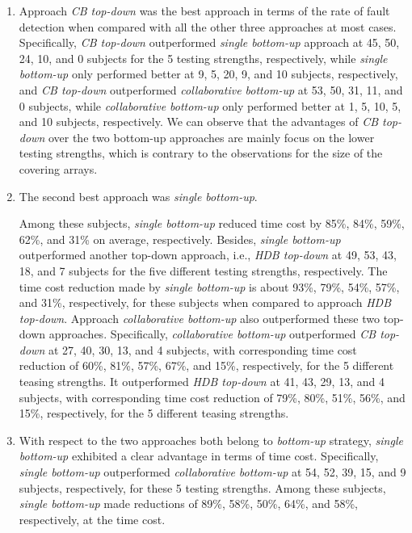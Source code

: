 \documentclass[conference]{IEEEtran}
\theoremstyle{definition}
\begin{document}
 \begin{enumerate}
 \item Approach \emph{CB top-down} was the best approach in terms of the rate of fault detection when compared with all the other three approaches at most cases. Specifically, \emph{CB top-down} outperformed \emph{single bottom-up} approach at 45, 50, 24, 10, and 0 subjects for the 5 testing strengths, respectively,  while \emph{single bottom-up} only performed better at 9, 5, 20, 9, and 10 subjects, respectively,  and \emph{CB top-down} outperformed \emph{collaborative bottom-up} at 53, 50, 31, 11, and 0 subjects, while \emph{collaborative bottom-up} only performed better at 1, 5, 10, 5, and 10 subjects, respectively. We can observe that the advantages of \emph{CB top-down}  over the two bottom-up approaches are mainly focus on the lower testing strengths, which is contrary to the observations for the size of the covering arrays. 

 \item The second best approach was \emph{single bottom-up}.

 Among these subjects, \emph{single bottom-up} reduced time cost by 85\%, 84\%, 59\%, 62\%, and 31\% on average, respectively. Besides, \emph{single bottom-up} outperformed another top-down approach, i.e., \emph{HDB top-down} at 49, 53, 43, 18, and 7 subjects for the five different testing strengths, respectively. The time cost reduction made by \emph{single bottom-up} is about 93\%, 79\%, 54\%, 57\%,  and  31\%, respectively, for these subjects when compared to approach \emph{HDB top-down}.  Approach \emph{collaborative bottom-up} also outperformed these two top-down approaches. Specifically, \emph{collaborative bottom-up} outperformed \emph{CB top-down} at 27, 40, 30, 13, and 4 subjects, with corresponding time cost reduction of 60\%, 81\%, 57\%, 67\%, and 15\%, respectively, for the 5 different teasing strengths.  It outperformed \emph{HDB top-down} at 41, 43, 29, 13, and 4 subjects, with corresponding time cost reduction of 79\%, 80\%, 51\%, 56\%, and 15\%, respectively, for the 5 different teasing strengths.

 \item With respect to the two approaches both belong to \emph{bottom-up} strategy, \emph{single bottom-up} exhibited a clear advantage in terms of time cost. Specifically, \emph{single bottom-up} outperformed  \emph{collaborative bottom-up}  at 54, 52, 39, 15, and 9 subjects, respectively, for these 5 testing strengths. Among these subjects,  \emph{single bottom-up} made reductions of  89\%, 58\%, 50\%, 64\%, and 58\%, respectively, at the time cost.


\end{enumerate}
\end{document}
